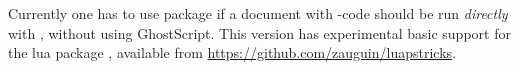 \documentclass[11pt,english,BCOR=10mm,DIV=12,bibliography=totoc,parskip=false,headings=small,
    headinclude=false,footinclude=false,twoside,usegeometry,dvipsnames]{pst-doc}
\begin{document}
\fi


\section{\LuaLaTeX}\label{lua}
Currently one has to use package  if a document with
\PSTricks-code should be run \emph{directly} with  \LuaLaTeX, without using
GhostScript. This version has experimental basic support for the lua package
, available from \url{https://github.com/zauguin/luapstricks}.

\nocite{*}
\printbibliography
\end{document}
